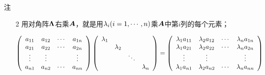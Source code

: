 \begin{frame}
\begin{footnotesize}
\begin{block}{注}
\begin{itemize}
\begin{scriptsize}
        \end{scriptsize}
        \pause 
      \item[2] 用对角阵$\boldsymbol{\Lambda}$右乘$\boldsymbol{A}$，就是用$\lambda_i(i=1,\cdots,n)$乘$\boldsymbol{A}$中第$i$列的每个元素；
        \pause 
      \item[]
        \begin{scriptsize}
          $$
          \left(
            \begin{array}{cccc}
              a_{11} & a_{12} & \cdots & a_{1n}\\
              a_{21} & a_{22} & \cdots & a_{2n}\\
              \vdots & \vdots &  & \vdots\\
              a_{n1} & a_{n2} & \cdots & a_{nn}
            \end{array}
          \right)  
          \left(
            \begin{array}{cccc}
              \lambda_1 & & &\\
                        & \lambda_2 & & \\
                        & & \ddots & \\
                        & & & \lambda_n
            \end{array}
          \right)
          = 
          \left(
            \begin{array}{cccc}
              \lambda_1a_{11} & \lambda_2a_{12} & \cdots & \lambda_na_{1n}\\
              \lambda_1a_{21} & \lambda_2a_{22} & \cdots & \lambda_na_{2n}\\
              \vdots & \vdots &  & \vdots\\
              \lambda_1a_{n1} & \lambda_2a_{n2} & \cdots & \lambda_na_{nn}
            \end{array}
          \right)
          $$

        \end{scriptsize}
      \end{itemize}
    \end{block}
  \end{footnotesize}
\end{frame}


